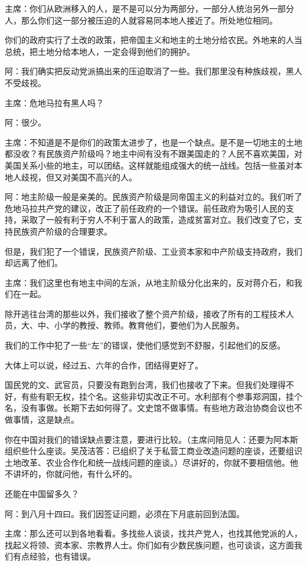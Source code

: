 主席：你们从欧洲移入的人，是不是可以分为两部分，一部分人统治另外一部分人，那么你们这一部分被压迫的人就容易同本地人接近了。所处地位相同。

你们的政府实行了土改的政策，把帝国主义和地主的土地分给农民。外地来的人当总统，把土地分给本地人，一定会得到他们的拥护。

阿：我们确实把反动党派搞出来的压迫取消了一些。我们那里没有种族歧视，黑人不受歧视。

主席：危地马拉有黑人吗？

阿：很少。

主席：不知道是不是你们的政策太进步了，也是一个缺点。是不是一切地主的土地都没收？有民族资产阶级吗？地主中间有没有不跟美国走的？人民不喜欢美国，对美国关系小些的地主，可以团结。这样就能组成强大的统一战线。包括一些虽对本地人歧视，但又对美国不高兴的人。

阿：地主阶级一般是亲美的。民族资产阶级是同帝国主义的利益对立的。我们听了危地马拉共产党的建议，改正了前任政府的一个错误。前任政府为吸引人民的支持，采取了一般有利于穷人不利于富人的政策，造成贫富对立。我们改变了它，支持民族资产阶级的合理要求。

但是，我们犯了一个错误，民族资产阶级、工业资本家和中产阶级支持政府，我们却远离了他们。

主席：我们这里也有地主中间的左派，从地主阶级分化出来的，反对蒋介石，和我们在一起。

除开逃往台湾的那些以外，我们接收了整个资产阶级，接收了所有的工程技术人员，大、中、小学的教授、教师。教育他们，要他们为人民服务。

我们的工作中犯了一些“左”的错误，使他们感觉到不舒服，引起他们的反感。

大体上可以说，经过五、六年的合作，团结得更好了。

国民党的文、武官员，只要没有跑到台湾，我们也接收了下来。但我们处理得不好，有些有职无权，挂个名。这些非切实改正不可。水利部有个参事郑洞国，挂个名，没有事做。长期下去如何得了。文史馆不做事情。有些地方政治协商会议也不做事情，这是缺点。

你在中国对我们的错误缺点要注意，要进行比较。（主席问陪见人：还要为阿本斯组织些什么座谈。吴茂洁答：已组织了关于私营工商业改造问题的座谈，还要组识土地改革、农业合作化和统一战线问题的座谈。）尽讲好的，你就不要相信他。他不讲坏的，你就问他，有什么坏的。

还能在中国留多久？

阿：到八月十四曰。我们因签证问题，必须在下月底前回到法国。

主席：那么还可以到各地看看。多找些人谈谈，找共产党人，也找其他党派的人，找起义将领、资本家、宗教界人士。你们如有少数民族问题，也可谈谈，这方面我们有点经验，也有错误。


